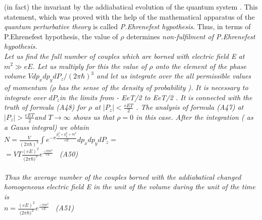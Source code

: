 \documentclass[a4paper,12pt] {article}
\begin{document}
(in fact) the invariant by the addiabatical evolution of the quantum system . \rm This statement, which
was proved with the help
of the mathematical apparatus of the { \it quantum perturbative theory} is called{ \it   P.Ehrenefest
hypothesis}.  Thus, in   terms of  P.Ehrenefest hypothesis, the value of $ \rho$  determines
\it non-fulfilment of  P.Ehrenefest hypothesis.
\\ \rm  Let us find { \it the full  number of  couples which are  borned with electric field }E \it at  \rm
 $ m^2 \gg eE $. Let us multiply for this the value of $ \rho$  onto the element of the phase volume
 $ V d p_x d p_y d P_ z / (2{\pi \hbar})^3 $ and let us
integrate over the all permissible values of momentum ($ \rho$  has the sense \it of the density of
probability \rm ).
It is necessary to integrate over $ d P_ z$in the limits from - EeT/2 to EeT/2 . It is connected with the truth
of  formula  (A48)   for  $\rho $  at  $ \vert P_z \vert< \frac{eET}{2}$
. The analysis of formula (A47) at $ \vert P_z\vert >\frac {eET}{2} $and $ T \to \infty$ shows us that
$\rho =0 $ in this case. After the integration ( as a Gauss integral)  we obtain
\\ $ N= \frac {V}{{(2\pi \hbar)}^3}\int e^{-\pi  \frac
{p_x^2+p_y^2+m^2}{eE}}dp_x dp_y dP_z = $ \\ $ = VT  \frac {{(eE)}^2}{{(2\pi \hbar})^3 }e^{\frac {-\pi m^2}{eE}} $ \ (A50)
\\\\ Thus \it the average number of the couples
borned with the addiabatical changed homogeneous electric field \rm E  \it in the unit of the volume
during
the  unit of  the time \rm is \\ $ n=\frac {{(eE)}^2}{{(2\pi \hbar})^3 }e^{\frac {-\pi m^2}{eE}} $ \ (A51)
\end{document}
